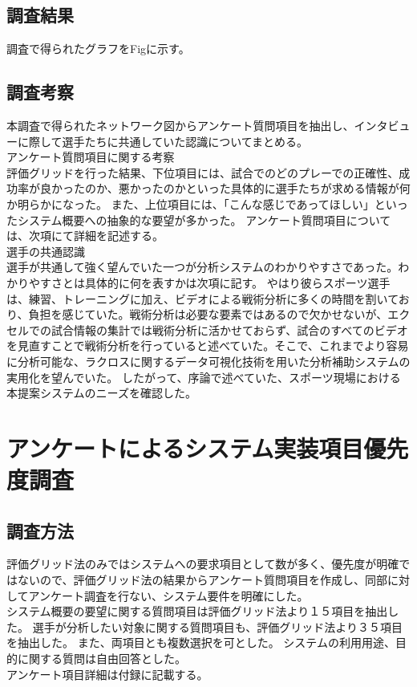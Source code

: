 \documentclass[sotsuron]{kuee}
\begin{document}
\subsection{調査結果}
調査で得られたグラフをFigに示す。
\subsection{調査考察}
本調査で得られたネットワーク図からアンケート質問項目を抽出し、インタビューに際して選手たちに共通していた認識についてまとめる。
\\アンケート質問項目に関する考察
\\評価グリッドを行った結果、下位項目には、試合でのどのプレーでの正確性、成功率が良かったのか、悪かったのかといった具体的に選手たちが求める情報が何か明らかになった。
また、上位項目には、「こんな感じであってほしい」といったシステム概要への抽象的な要望が多かった。
アンケート質問項目については、次項にて詳細を記述する。
\\選手の共通認識
\\選手が共通して強く望んでいた一つが分析システムのわかりやすさであった。わかりやすさとは具体的に何を表すかは次項に記す。
やはり彼らスポーツ選手は、練習、トレーニングに加え、ビデオによる戦術分析に多くの時間を割いており、負担を感じていた。戦術分析は必要な要素ではあるので欠かせないが、エクセルでの試合情報の集計では戦術分析に活かせておらず、試合のすべてのビデオを見直すことで戦術分析を行っていると述べていた。そこで、これまでより容易に分析可能な、ラクロスに関するデータ可視化技術を用いた分析補助システムの実用化を望んでいた。
したがって、序論で述べていた、スポーツ現場における本提案システムのニーズを確認した。

\section{アンケートによるシステム実装項目優先度調査}
\subsection{調査方法}
評価グリッド法のみではシステムへの要求項目として数が多く、優先度が明確ではないので、評価グリッド法の結果からアンケート質問項目を作成し、同部に対してアンケート調査を行ない、システム要件を明確にした。
\\システム概要の要望に関する質問項目は評価グリッド法より１５項目を抽出した。
選手が分析したい対象に関する質問項目も、評価グリッド法より３５項目を抽出した。
また、両項目とも複数選択を可とした。
システムの利用用途、目的に関する質問は自由回答とした。
\\アンケート項目詳細は付録に記載する。
\end{document}
